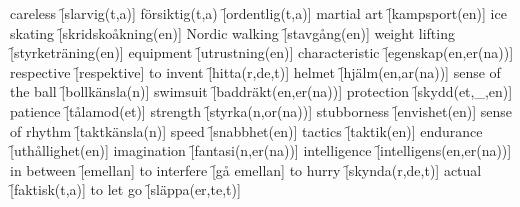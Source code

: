\begin{questions}
\begin{multicols}{2}
        \question careless \f[slarvig(t,a)]
        \question försiktig(t,a) \f[ordentlig(t,a)]
        \question martial art \f[kampsport(en)]
        \question ice skating \f[skridskoåkning(en)]
        \question Nordic walking \f[stavgång(en)]
        \question weight lifting \f[styrketräning(en)]
        \question equipment \f[utrustning(en)]
        \question characteristic \f[egenskap(en,er(na))]
        \question respective \f[respektive]
        \question to invent \f[hitta(r,de,t)]
        \question helmet \f[hjälm(en,ar(na))]
        \question sense of the ball \f[bollkänsla(n)]
        \question swimsuit \f[baddräkt(en,er(na))]
        \question protection \f[skydd(et,\_,en)]
        \question patience \f[tålamod(et)]
        \question strength \f[styrka(n,or(na))]
        \question stubborness \f[envishet(en)]
        \question sense of rhythm \f[taktkänsla(n)]
        \question speed \f[snabbhet(en)]
        \question tactics \f[taktik(en)]
        \question endurance \f[uthållighet(en)]
        \question imagination \f[fantasi(n,er(na))]
        \question intelligence \f[intelligens(en,er(na))]
        \question in between \f[emellan]
        \question to interfere \f[gå emellan]
        \question to hurry \f[skynda(r,de,t)]
        \question actual \f[faktisk(t,a)]
        \question to let go \f[släppa(er,te,t)]
    \end{multicols}
\end{questions}
